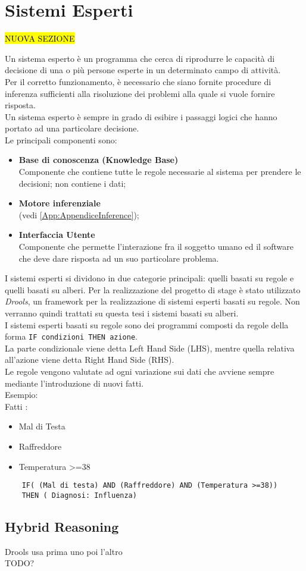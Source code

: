 \section{Sistemi Esperti}
\hl{NUOVA SEZIONE}
 \label{App:AppendiceSistemiEsperti}
 
 Un sistema esperto è un programma che cerca di riprodurre le capacità di decisione di una o più persone esperte in un determinato campo di attività. \\
 Per il corretto funzionamento, è necessario che siano fornite procedure di inferenza sufficienti alla risoluzione dei problemi alla quale si vuole fornire risposta. \\
 Un sistema esperto è sempre in grado di esibire i passaggi logici che hanno portato ad una particolare decisione. \\
 Le principali componenti sono: 
 \begin{itemize}
 	\item \textbf{Base di conoscenza (Knowledge Base)}\\
	 	Componente che contiene tutte le regole necessarie al sistema per prendere le decisioni; non contiene i dati; 
	\item \textbf{Motore inferenziale} \\
	  (vedi \autoref{App:AppendiceInference});
	\item \textbf{Interfaccia Utente} \\
		Componente che permette l'interazione fra il soggetto umano ed il software che deve dare risposta ad un suo particolare problema.
 \end{itemize}
 
 
 I sistemi esperti si dividono in due categorie principali: quelli basati su regole e quelli basati su alberi. 
 Per la realizzazione del progetto di stage è stato utilizzato \textit{Drools}, un framework per la realizzazione di sistemi esperti basati su regole. Non verranno quindi trattati su questa tesi i sistemi basati su alberi.\\
 I sistemi esperti basati su regole sono dei programmi composti da regole della forma \texttt{IF condizioni THEN azione}.\\
  La parte condizionale viene detta Left Hand Side (LHS), mentre quella relativa all'azione viene detta Right Hand Side (RHS).\\
 Le regole vengono valutate ad ogni variazione sui dati che avviene sempre mediante l'introduzione di nuovi fatti.\\
 Esempio: \\
	 Fatti :
	 \begin{itemize}
	 	\item Mal di Testa
	 	\item Raffreddore
	 	\item Temperatura >=38
	 \end{itemize}
 \begin{lstlisting}
	IF( (Mal di testa) AND (Raffreddore) AND (Temperatura >=38))
	THEN ( Diagnosi: Influenza)
 \end{lstlisting}

 
 



 \subsection{Hybrid Reasoning}
 Drools usa prima uno poi l'altro \textcite{eco:tesi} \\
 TODO?